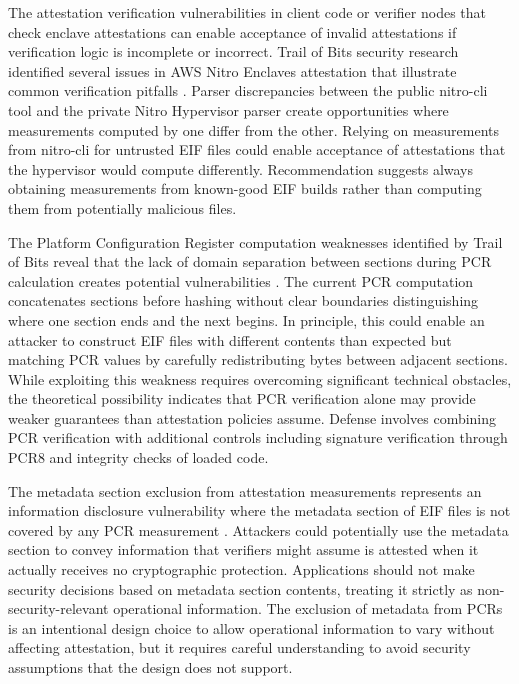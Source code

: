 The attestation verification vulnerabilities in client code or verifier nodes that check enclave attestations can enable acceptance of invalid attestations if verification logic is incomplete or incorrect. Trail of Bits security research identified several issues in AWS Nitro Enclaves attestation that illustrate common verification pitfalls \cite{trail_of_bits_nitro}. Parser discrepancies between the public nitro-cli tool and the private Nitro Hypervisor parser create opportunities where measurements computed by one differ from the other. Relying on measurements from nitro-cli for untrusted EIF files could enable acceptance of attestations that the hypervisor would compute differently. Recommendation suggests always obtaining measurements from known-good EIF builds rather than computing them from potentially malicious files.

The Platform Configuration Register computation weaknesses identified by Trail of Bits reveal that the lack of domain separation between sections during PCR calculation creates potential vulnerabilities \cite{trail_of_bits_nitro}. The current PCR computation concatenates sections before hashing without clear boundaries distinguishing where one section ends and the next begins. In principle, this could enable an attacker to construct EIF files with different contents than expected but matching PCR values by carefully redistributing bytes between adjacent sections. While exploiting this weakness requires overcoming significant technical obstacles, the theoretical possibility indicates that PCR verification alone may provide weaker guarantees than attestation policies assume. Defense involves combining PCR verification with additional controls including signature verification through PCR8 and integrity checks of loaded code.

The metadata section exclusion from attestation measurements represents an information disclosure vulnerability where the metadata section of EIF files is not covered by any PCR measurement \cite{trail_of_bits_nitro}. Attackers could potentially use the metadata section to convey information that verifiers might assume is attested when it actually receives no cryptographic protection. Applications should not make security decisions based on metadata section contents, treating it strictly as non-security-relevant operational information. The exclusion of metadata from PCRs is an intentional design choice to allow operational information to vary without affecting attestation, but it requires careful understanding to avoid security assumptions that the design does not support.

